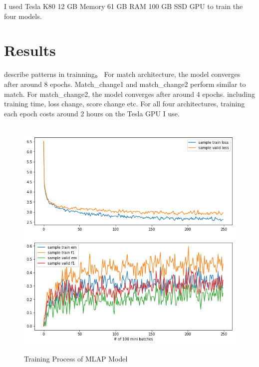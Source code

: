 \documentclass[modernstyle,12pt]{sjsuthesis}
\theoremstyle{definition}
\begin{document}
I used Tesla K80 12 GB Memory 61 GB RAM 100 GB SSD GPU to train the four models.


\section{Results}



describe patterns in trainning。 For match architecture, the model converges after around 8 epochs. Match\_change1 and match\_change2 perform similar to match. For match\_change2, the model converges after around 4 epochs.  including training time, loss change, score change etc. For all four architectures, training each epoch costs around 2 hours on the Tesla GPU I use.

\begin{figure}[htbp]\centering
  \includegraphics[width=12cm, height=12cm]{figures/match_corrected.png}
  \caption{Training Process of MLAP Model}
  \label{f:mlap}
\end{figure}
\end{document}
